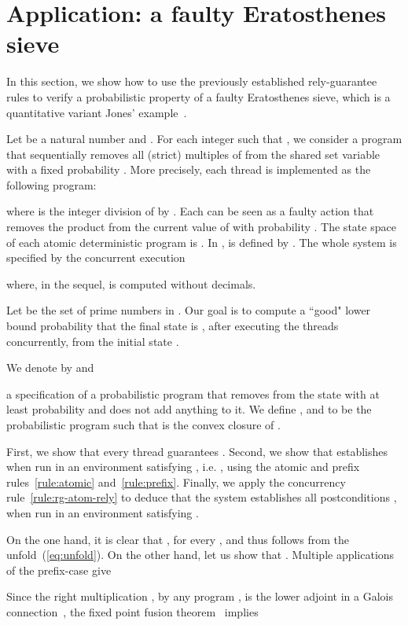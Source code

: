 \documentclass[review]{elsart}
\begin{document}
\section{Application: a faulty Eratosthenes sieve}\label{sec:application}

In this section, we show how to use the previously established rely-guarantee rules to verify a probabilistic property of a faulty Eratosthenes sieve, which is a quantitative variant Jones' example~\cite{Jon81}.

Let  be a natural number and . For each integer  such that , we consider a program  that sequentially removes all (strict) multiples of  from the shared set variable  with a fixed probability . More precisely, each thread  is implemented as the following program: 

where  is the integer division of  by . Each  can be seen as a faulty action that removes the product  from the current value of  with probability . The state space of each atomic deterministic program  is . In ,  is defined by . 
The whole system is specified by the concurrent execution 

where, in the sequel,  is computed without decimals.

Let    be the set of prime numbers in . Our goal is to compute a ``good" lower bound probability that the final state is , after executing the threads  concurrently, from the initial state .

We denote by  and 

a specification of a probabilistic program that removes  from the state  with at least probability  and does not add anything to it. We define ,  and  to be the probabilistic program such that  is the convex closure of . 

First, we show that every thread  guarantees . Second, we show that  establishes  when run in an environment satisfying , i.e. , using the atomic and prefix rules~\ref{rule:atomic} and~\ref{rule:prefix}. Finally, we  apply the concurrency rule~\ref{rule:rg-atom-rely} to deduce that the system  establishes all postconditions , when run in an environment satisfying .

 
On the one hand, it is clear that , for every , and thus  follows from the unfold~(\ref{eq:unfold}). On the other hand, let us show that . Multiple applications of the prefix-case give 

Since the right multiplication , by any program , is the lower adjoint in a Galois connection~\cite{Mci04}, the fixed point fusion theorem~\cite{Bac02} implies  
\end{document}
